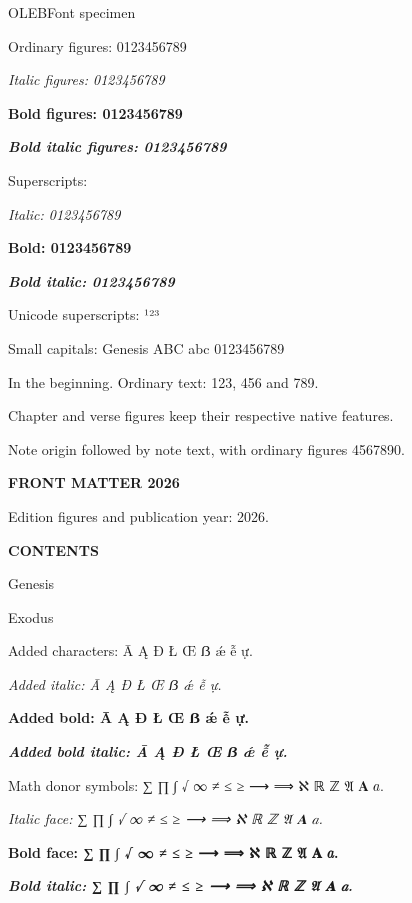 \documentclass[10pt]{article}
\begin{document}
{\Large OLEBFont specimen}\par\medskip
Ordinary figures: 0123456789\par
\textit{Italic figures: 0123456789}\par
\textbf{Bold figures: 0123456789}\par
\textbf{\textit{Bold italic figures: 0123456789}}\par\medskip
Superscripts: {}\par
\textit{Italic: {\superiors\itshape 0123456789}}\par
\textbf{Bold: {\superiors\bfseries 0123456789}}\par
\textbf{\textit{Bold italic: {\superiors\bfseries\itshape 0123456789}}}\par
Unicode superscripts: ¹²³\par\medskip
{\furniture Small capitals: Genesis ABC abc 0123456789}\par\medskip
{\fontsize{24}{26}}\quad
{} In the beginning. Ordinary text: 123, 456 and 789.\par
{} Chapter and verse figures keep their respective native features.\par\medskip
{\fontsize{8.3333}{10}\selectfont
 {\superiors\fontsize{10}{12.5}}\kern1pt\nobreak
 Note origin followed by note text, with ordinary figures 4567890.}\par\medskip
{\bfseries FRONT MATTER 2026}\par
Edition figures and publication year: 2026.\par\medskip
{\bfseries CONTENTS}\par
Genesis\par
Exodus\par\medskip
Added characters: Ā Ą Đ Ł Œ ẞ ǽ ễ ự.\par
\textit{Added italic: Ā Ą Đ Ł Œ ẞ ǽ ễ ự.}\par
\textbf{Added bold: Ā Ą Đ Ł Œ ẞ ǽ ễ ự.}\par
\textbf{\textit{Added bold italic: Ā Ą Đ Ł Œ ẞ ǽ ễ ự.}}\par

\medskip
Math donor symbols: ∑ ∏ ∫ √ ∞ ≠ ≤ ≥ ⟶ ⟹ ℵ ℝ ℤ 𝔄 𝐀 𝑎.\par
\textit{Italic face: ∑ ∏ ∫ √ ∞ ≠ ≤ ≥ ⟶ ⟹ ℵ ℝ ℤ 𝔄 𝐀 𝑎.}\par
\textbf{Bold face: ∑ ∏ ∫ √ ∞ ≠ ≤ ≥ ⟶ ⟹ ℵ ℝ ℤ 𝔄 𝐀 𝑎.}\par
\textbf{\textit{Bold italic: ∑ ∏ ∫ √ ∞ ≠ ≤ ≥ ⟶ ⟹ ℵ ℝ ℤ 𝔄 𝐀 𝑎.}}\par
\end{document}
